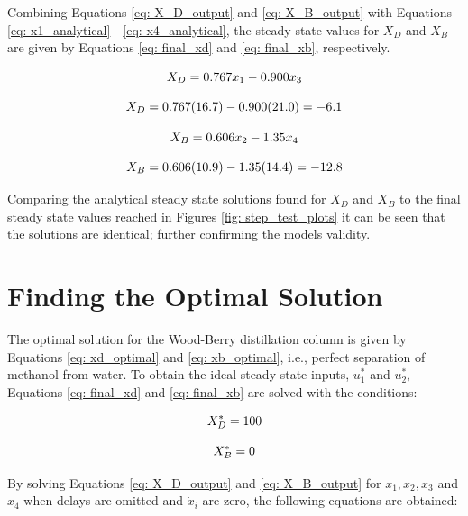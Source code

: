 Combining Equations \ref{eq: X_D_output} and \ref{eq: X_B_output} with Equations \ref{eq: x1_analytical} - \ref{eq: x4_analytical}, the steady state values for $X_D$ and $X_B$ are given by Equations \ref{eq: final_xd} and \ref{eq: final_xb}, respectively. \\

{
\begin{equation}
    \centering
    X_D = 0.767x_1 - 0.900x_3
\end{equation}

\begin{equation}
    \centering
    X_D = 0.767(16.7) - 0.900(21.0) = -6.1
    \label{eq: final_xd}
\end{equation}

\begin{equation}
    \centering
    X_B = 0.606x_2 - 1.35x_4
\end{equation}

\begin{equation}
    \centering
    X_B = 0.606(10.9) - 1.35(14.4) = -12.8
    \label{eq: final_xb}
\end{equation}
}

Comparing the analytical steady state solutions found for $X_D$ and $X_B$ to the final steady state values reached in Figures \ref{fig: step_test_plots} it can be seen that the solutions are identical; further confirming the models validity.

\section{Finding the Optimal Solution}

The optimal solution for the Wood-Berry distillation column is given by Equations \ref{eq: xd_optimal} and \ref{eq: xb_optimal}, i.e., perfect separation of methanol from water. To obtain the ideal steady state inputs, $u_1^*$ and $u_2^*$, Equations \ref{eq: final_xd} and \ref{eq: final_xb} are solved with the conditions:

{
\begin{equation}
    \centering
    X_D^* = 100
    \label{eq: xd_optimal}
\end{equation}

\begin{equation}
    \centering
    X_B^* = 0
    \label{eq: xb_optimal}
\end{equation}
}

By solving Equations \ref{eq: X_D_output} and \ref{eq: X_B_output} for $x_1, x_2, x_3$ and $x_4$ when delays are omitted and $\dot{x}_i$ are zero, the following equations are obtained: \\

